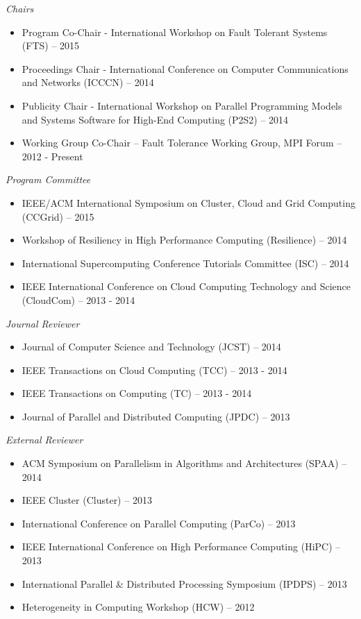 {\sl Chairs}
\begin{itemize}
    \item Program Co-Chair - International Workshop on Fault Tolerant Systems
        (FTS) -- 2015
    \item Proceedings Chair - International Conference on Computer
        Communications and Networks (ICCCN) -- 2014
    \item Publicity Chair - International Workshop on Parallel Programming
        Models and Systems Software for High-End Computing (P2S2) -- 2014
    \item Working Group Co-Chair -- Fault Tolerance Working Group, MPI Forum -- 2012 - Present
\end{itemize}

{\sl Program Committee}
\begin{itemize}
    \item IEEE/ACM International Symposium on Cluster, Cloud and Grid
        Computing (CCGrid) -- 2015
    \item Workshop of Resiliency in High Performance Computing (Resilience) --
        2014
    \item International Supercomputing Conference Tutorials Committee (ISC) --
        2014
    \item IEEE International Conference on Cloud Computing Technology and
        Science (CloudCom) -- 2013 - 2014
\end{itemize}

{\sl Journal Reviewer}
\begin{itemize}
    \item Journal of Computer Science and Technology (JCST) -- 2014
    \item IEEE Transactions on Cloud Computing (TCC) -- 2013 - 2014
    \item IEEE Transactions on Computing (TC) -- 2013 - 2014
    \item Journal of Parallel and Distributed Computing (JPDC) -- 2013
\end{itemize}

{\sl External Reviewer}
\begin{itemize}
    \item ACM Symposium on Parallelism in Algorithms and Architectures (SPAA) -- 2014
    \item IEEE Cluster (Cluster) -- 2013
    \item International Conference on Parallel Computing (ParCo) -- 2013
    \item IEEE International Conference on High Performance Computing (HiPC) -- 2013
    \item International Parallel \& Distributed Processing Symposium (IPDPS) -- 2013
    \item Heterogeneity in Computing Workshop (HCW) -- 2012
\end{itemize}

